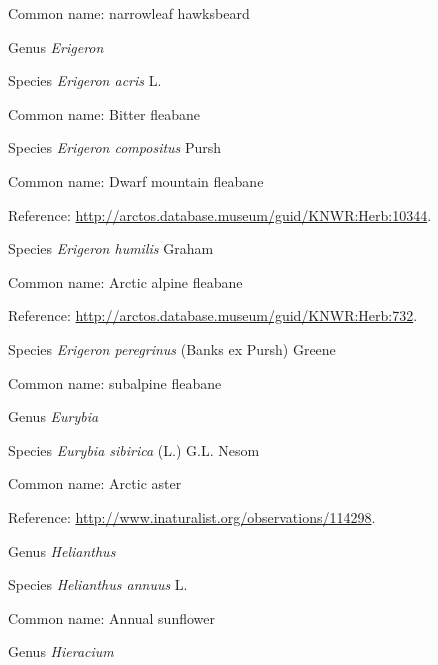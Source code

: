 \documentclass[9pt, article]{memoir}
\begin{document}
\begin{multicols}{2}
Common name: narrowleaf hawksbeard

\vspace{6pt}\noindent\hspace{30pt}Genus \textit{Erigeron}


\vspace{6pt}\noindent\hspace{36pt}Species \textit{Erigeron acris} L.


Common name: Bitter fleabane

\vspace{6pt}\noindent\hspace{36pt}Species \textit{Erigeron compositus} Pursh


Common name: Dwarf mountain fleabane

Reference: 
\url{http://arctos.database.museum/guid/KNWR:Herb:10344}.

\vspace{6pt}\noindent\hspace{36pt}Species \textit{Erigeron humilis} Graham


Common name: Arctic alpine fleabane

Reference: 
\url{http://arctos.database.museum/guid/KNWR:Herb:732}.

\vspace{6pt}\noindent\hspace{36pt}Species \textit{Erigeron peregrinus} (Banks ex Pursh) Greene


Common name: subalpine fleabane

\vspace{6pt}\noindent\hspace{30pt}Genus \textit{Eurybia}


\vspace{6pt}\noindent\hspace{36pt}Species \textit{Eurybia sibirica} (L.) G.L. Nesom


Common name: Arctic aster

Reference: 
\url{http://www.inaturalist.org/observations/114298}.

\vspace{6pt}\noindent\hspace{30pt}Genus \textit{Helianthus}


\vspace{6pt}\noindent\hspace{36pt}Species \textit{Helianthus annuus} L.


Common name: Annual sunflower

\vspace{6pt}\noindent\hspace{30pt}Genus \textit{Hieracium}



\end{multicols}
\end{document}
